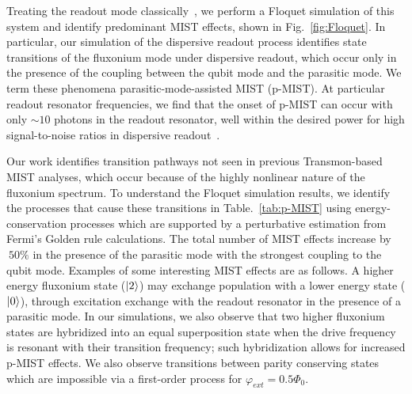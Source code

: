 \documentclass[%
reprint,
superscriptaddress,
 amsmath,amssymb,
 aps,
 prx,
longbibliography,
floatfix,
]{revtex4-2}
\begin{document}
Treating the readout mode classically~\cite{cohen2023reminiscence,dumas2024unified}, we perform a Floquet simulation of this system and identify predominant MIST effects, shown in Fig.~\ref{fig:Floquet}. In particular, our simulation of the dispersive readout process identifies state transitions of the fluxonium mode under dispersive readout, which occur only in the presence of the coupling between the qubit mode and the parasitic mode. We term these phenomena parasitic-mode-assisted MIST (p-MIST). At particular readout resonator frequencies, we find that the onset of p-MIST  can occur with only $\sim 10$ photons in the readout resonator, well within the desired power for high signal-to-noise ratios in dispersive readout~\cite{gusenkova2021quantum}.

Our work identifies transition pathways not seen in previous Transmon-based MIST analyses, which occur because of the highly nonlinear nature of the fluxonium spectrum. To understand the Floquet simulation results, we identify the processes that cause these transitions in Table.~\ref{tab:p-MIST} using energy-conservation processes which are supported by a perturbative estimation from Fermi's Golden rule calculations. The total number of MIST effects increase by $~50\%$ in the presence of the parasitic mode with the strongest coupling to the qubit mode. Examples of some interesting MIST effects are as follows. A higher energy fluxonium state ($\ket{2}$) may exchange population with a lower energy state ($\ket{0}$), through excitation exchange with the readout resonator in the presence of a parasitic mode. In our simulations, we also observe that two higher fluxonium states are hybridized into an equal superposition state when the drive frequency is resonant with their transition frequency; such hybridization allows for increased p-MIST effects. We also observe transitions between parity conserving states which are impossible via a first-order process for $\varphi_{ext}=0.5\Phi_0$.
\end{document}
